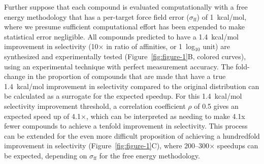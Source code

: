 \documentclass[phd,tocprelim]{cornell}
\begin{document}
Further suppose that each compound is evaluated computationally with a free energy methodology that has a per-target force field error ($\sigma_\text{ff}$) of 1~kcal/mol, where we presume sufficient computational effort has been expended to make statistical error negligible. 
All compounds predicted to have a 1.4~kcal/mol improvement in selectivity (10$\times$ in ratio of affinities, or 1~log$_{10}$ unit) are synthesized and experimentally tested (Figure~\ref{fig:figure-1}B, colored curves), using an experimental technique with perfect measurement accuracy. 
The fold-change in the proportion of compounds that are made that have a true 1.4~kcal/mol improvement in selectivity compared to the original distribution can be calculated as a surrogate for the expected speedup. 
For this 1.4~kcal/mol selectivity improvement threshold, a correlation coefficient $\rho$ of 0.5 gives an expected speed up of 4.1$\times$, which can be interpreted as needing to make 4.1x fewer compounds to achieve a tenfold improvement in selectivity. 
This process can be extended for the even more difficult proposition of achieving a hundredfold improvement in selectivity (Figure~\ref{fig:figure-1}C), where 200--300$\times$ speedups can be expected, depending on $\sigma_\text{ff}$ for the free energy methodology. 
\end{document}
